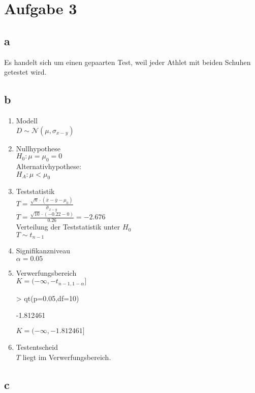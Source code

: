 

\section{Aufgabe 3}

\subsection{a}
Es handelt sich um einen gepaarten Test, weil jeder Athlet mit beiden Schuhen 
getestet wird. 

\subsection{b}
\begin{enumerate}
  \item Modell \\
    $ D \sim \mathcal{N}(\mu,\hat{\sigma}_{x-y})$
  \item Nullhypothese \\
    $H_0: \mu=\mu_0=0$\\
    Alternativhypothese: \\
    $H_A: \mu<\mu_0$
  \item Teststatistik \\
    $T = \frac{\sqrt{n}\cdot(\bar{x}-\bar{y}-\mu_0)}{\hat{\sigma}_{x-y}}$ \\
    $T = \frac{\sqrt{10}\cdot(-0.22-0)}{0.26} = -2.676$ \\
    Verteilung der Teststatistik unter $H_0$\\
    $T \sim t_{n-1}$
  \item Signifikanzniveau \\
    $\alpha=0.05$
  \item Verwerfungsbereich \\
    $K = (-\infty,-t_{n-1,1-\alpha}]$
\begin{Schunk}
\begin{Sinput}
> qt(p=0.05,df=10)
\end{Sinput}
\begin{Soutput}
[1] -1.812461
\end{Soutput}
\end{Schunk}
    $K = (-\infty,-1.812461]$
  \item Testentscheid \\
    $T$ liegt im Verwerfungsbereich. 
\end{enumerate}

\subsection{c}
